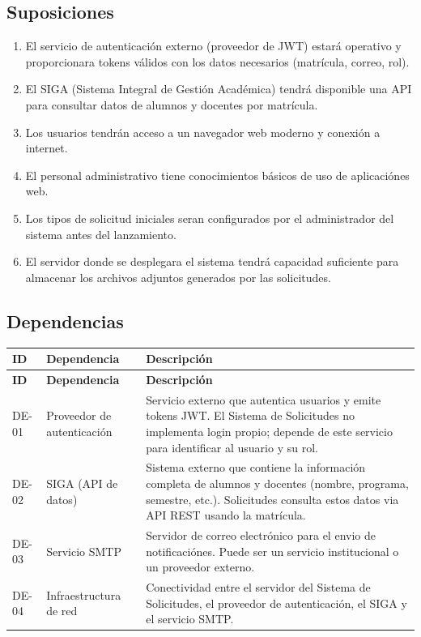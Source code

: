 \subsection*{Suposiciones}

\begin{enumerate}
    \item El servicio de autenticación externo (proveedor de JWT) estará operativo y proporcionara tokens válidos con los datos necesarios (matrícula, correo, rol).
    \item El SIGA (Sistema Integral de Gestión Académica) tendrá disponible una API para consultar datos de alumnos y docentes por matrícula.
    \item Los usuarios tendrán acceso a un navegador web moderno y conexión a internet.
    \item El personal administrativo tiene conocimientos básicos de uso de aplicaciónes web.
    \item Los tipos de solicitud iniciales seran configurados por el administrador del sistema antes del lanzamiento.
    \item El servidor donde se desplegara el sistema tendrá capacidad suficiente para almacenar los archivos adjuntos generados por las solicitudes.
\end{enumerate}

\subsection*{Dependencias}

\begin{longtable}{|C{1.2cm}|L{4.5cm}|L{8cm}|}
    \hline
    \textbf{ID} & \textbf{Dependencia} & \textbf{Descripción} \\
    \hline
    \endfirsthead
    \hline
    \textbf{ID} & \textbf{Dependencia} & \textbf{Descripción} \\
    \hline
    \endhead
    \hline
    \endfoot

    DE-01 & Proveedor de autenticación & Servicio externo que autentica usuarios y emite tokens JWT. El Sistema de Solicitudes no implementa login propio; depende de este servicio para identificar al usuario y su rol. \\
    \hline
    DE-02 & SIGA (API de datos) & Sistema externo que contiene la información completa de alumnos y docentes (nombre, programa, semestre, etc.). Solicitudes consulta estos datos via API REST usando la matrícula. \\
    \hline
    DE-03 & Servicio SMTP & Servidor de correo electrónico para el envio de notificaciónes. Puede ser un servicio institucional o un proveedor externo. \\
    \hline
    DE-04 & Infraestructura de red & Conectividad entre el servidor del Sistema de Solicitudes, el proveedor de autenticación, el SIGA y el servicio SMTP. \\
    \hline
\end{longtable}

